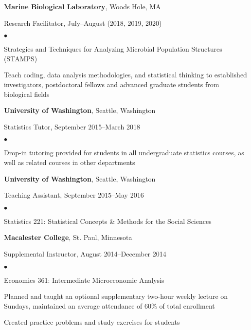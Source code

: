 \documentclass[margin,centered]{res}
\newenvironment{list1}{
  \begin{list}{\ding{113}}{%
      \setlength{\itemsep}{0in}
      \setlength{\parsep}{0in} \setlength{\parskip}{0in}
      \setlength{\topsep}{0in} \setlength{\partopsep}{0in}
      \setlength{\leftmargin}{0.17in}}}{\end{list}}
\newenvironment{list2}{
  \begin{list}{$\bullet$}{%
      \setlength{\itemsep}{0in}
      \setlength{\parsep}{0in} \setlength{\parskip}{0in}
      \setlength{\topsep}{0in} \setlength{\partopsep}{0in}
      \setlength{\leftmargin}{0.2in}}}{\end{list}}
\begin{document}
\begin{resume}
{\bf Marine Biological Laboratory}, Woods Hole, MA
\begin{list1}
\item[] Research Facilitator, July--August (2018, 2019, 2020)
\begin{list2}
\vspace*{.05in}
\item Strategies and Techniques for Analyzing Microbial Population Structures (STAMPS)
\item Teach coding, data analysis methodologies, and statistical thinking to established investigators, postdoctoral fellows and advanced graduate students from biological fields
\end{list2}
\end{list1}

{\bf University of Washington}, Seattle, Washington
\begin{list1}
\item[] Statistics Tutor, September 2015--March 2018
\begin{list2}
\vspace*{.05in}
\item Drop-in tutoring provided for students in all undergraduate statistics courses, as well as related courses in other departments
\end{list2}
\end{list1}

{\bf University of Washington}, Seattle, Washington
\begin{list1}
\item[] Teaching Assistant, September 2015--May 2016
\begin{list2}
\vspace*{.05in}
\item Statistics 221: Statistical Concepts \& Methods for the Social Sciences
\end{list2}
\end{list1}


{\bf Macalester College}, St. Paul, Minnesota
\begin{list1}
\item[] Supplemental Instructor, August 2014--December 2014
\begin{list2}
\vspace*{.05in}
\item Economics 361: Intermediate Microeconomic Analysis
\item Planned and taught an optional supplementary two-hour weekly lecture on Sundays, maintained an average attendance of 60\% of total enrollment
\item Created practice problems and study exercises for students
\end{list2}
\end{list1}


\end{resume}
\end{document}
